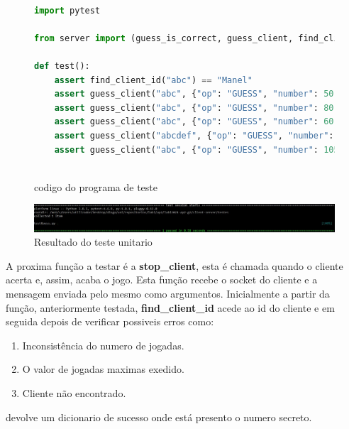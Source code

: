 \documentclass{report}
\newenvironment{changemargin}[2]{%
\begin{list}{}{%
\setlength{\topsep}{0pt}%
\setlength{\leftmargin}{#1}%
\setlength{\rightmargin}{#2}%
\setlength{\listparindent}{\parindent}%
\setlength{\itemindent}{\parindent}%
\setlength{\parsep}{\parskip}%
}%
\item[]}{\end{list}}
\theoremstyle{remark}
\begin{document}
\begin{figure}[H]\label{fig:fig31}
\begin{changemargin}{-3.5cm}{-3.5cm}
\begin{tcolorbox}
\begin{lstlisting}[language=Python, inputencoding=utf8, breaklines=true, basicstyle=\small, showstringspaces=false]

import pytest

from server import (guess_is_correct, guess_client, find_client_id)

def test():
	assert find_client_id("abc") == "Manel" 
	assert guess_client("abc", {"op": "GUESS", "number": 50, "cipher": None}) == { "op": "GUESS", "status":True, "result": "smaller" }
	assert guess_client("abc", {"op": "GUESS", "number": 80, "cipher": None}) == { "op": "GUESS", "status":True, "result": "larger" }
	assert guess_client("abc", {"op": "GUESS", "number": 60 ,"cipher": None}) == { "op": "GUESS", "status":True, "result": "equals" }
	assert guess_client("abcdef", {"op": "GUESS", "number": 60, "cipher": None}) == { "op": "GUESS", "status":False, "error": "Cliente inexistente" }
	assert guess_client("abc", {"op": "GUESS", "number": 105, "cipher": None}) == { "op": "GUESS", "status":False, 'error': 'Valor fora dos limites (0 <= number <= 100)'}
	
\end{lstlisting}
\end{tcolorbox}
\caption{codigo do programa de teste}
\end{changemargin}
\end{figure}

\begin{figure}[H]\label{fig:fig32}
\begin{changemargin}{-3.5cm}{-3.5cm}
\center
\includegraphics[width = 15 cm ]{testGuess_result.jpg}
\caption{Resultado do teste unitario}
\end{changemargin}
\end{figure}

\vspace{10mm}


A proxima função a testar é a  \textbf{stop\_client}, esta é chamada quando o cliente acerta e, assim, acaba o jogo. Esta função recebe o socket do cliente e a mensagem enviada pelo mesmo como argumentos. Inicialmente a partir da função, anteriormente testada, \textbf{find\_client\_id} acede ao id do cliente e em seguida depois de verificar possiveis erros como:
\begin{enumerate}
  \item Inconsistência do numero de jogadas.
  \item O valor de jogadas maximas exedido.
  \item Cliente não encontrado.
\end{enumerate}
devolve um dicionario de sucesso onde está presento o numero secreto.  
\end{document}
